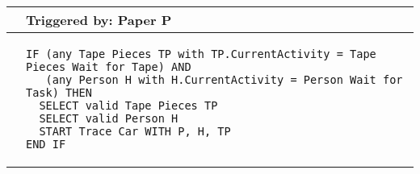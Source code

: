 \begin{longtable}{@{}>{\raggedright\arraybackslash}p{0.25cm}>{\raggedright\arraybackslash}p{13cm}@{}}
  \toprule
   & Triggered by: Paper P\\ \midrule 
  &
\begin{lstlisting}[language=CMPseudo]
IF (any Tape Pieces TP with TP.CurrentActivity = Tape Pieces Wait for Tape) AND
   (any Person H with H.CurrentActivity = Person Wait for Task) THEN
  SELECT valid Tape Pieces TP
  SELECT valid Person H
  START Trace Car WITH P, H, TP
END IF
\end{lstlisting}
  \\ \bottomrule
  \end{longtable}
